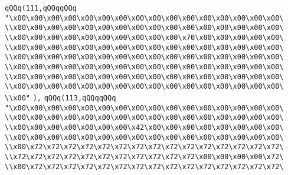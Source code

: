 \verb|qQQq(111,qQQqqQQq|\newline
\verb|"\x00\x00\x00\x00\x00\x00\x00\x00\x00\x00\x00\x00\x00\x00\x00\x00\|\newline
\verb|\\x00\x00\x00\x00\x00\x00\x00\x00\x00\x00\x00\x00\x00\x00\x00\x00\|\newline
\verb|\\x00\x00\x00\x00\x00\x00\x00\x00\x00\x00\x70\x00\x00\x00\x00\x00\|\newline
\verb|\\x00\x00\x00\x00\x00\x00\x00\x00\x00\x00\x00\x00\x00\x00\x00\x00\|\newline
\verb|\\x00\x00\x00\x00\x00\x00\x00\x00\x00\x00\x00\x00\x00\x00\x00\x00\|\newline
\verb|\\x00\x00\x00\x00\x00\x00\x00\x00\x00\x00\x00\x00\x00\x00\x00\x00\|\newline
\verb|\\x00\x00\x00\x00\x00\x00\x00\x00\x00\x00\x00\x00\x00\x00\x00\x00\|\newline
\verb|\\x00\x00\x00\x00\x00\x00\x00\x00\x00\x00\x00\x00\x00\x00\x00\x00\|\newline
\verb|\\x00"|\newline
\verb|),|\newline
\verb|qQQq(113,qQQqqQQq|\newline
\verb|"\x00\x00\x00\x00\x00\x00\x00\x00\x00\x00\x00\x00\x00\x00\x00\x00\|\newline
\verb|\\x00\x00\x00\x00\x00\x00\x00\x00\x00\x00\x00\x00\x00\x00\x00\x00\|\newline
\verb|\\x00\x00\x00\x00\x00\x00\x00\x42\x00\x00\x00\x00\x00\x00\x00\x00\|\newline
\verb|\\x00\x00\x00\x00\x00\x00\x00\x00\x00\x00\x00\x00\x00\x00\x00\x00\|\newline
\verb|\\x00\x72\x72\x72\x72\x72\x72\x72\x72\x72\x72\x72\x72\x72\x72\x72\|\newline
\verb|\\x72\x72\x72\x72\x72\x72\x72\x72\x72\x72\x72\x00\x00\x00\x00\x72\|\newline
\verb|\\x00\x72\x72\x72\x72\x72\x72\x72\x72\x72\x72\x72\x72\x72\x72\x72\|\newline
